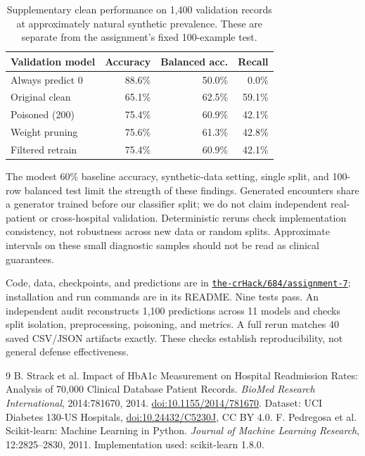 \documentclass[letterpaper,twocolumn,10pt]{article}
\begin{document}
\begin{table}[t]
\centering\small
\begin{tabular}{lrrr}
\toprule
Validation model & Accuracy & Balanced acc. & Recall\\
\midrule
Always predict 0 & 88.6\% & 50.0\% & 0.0\%\\
Original clean & 65.1\% & 62.5\% & 59.1\%\\
Poisoned (200) & 75.4\% & 60.9\% & 42.1\%\\
Weight pruning & 75.6\% & 61.3\% & 42.8\%\\
Filtered retrain & 75.4\% & 60.9\% & 42.1\%\\
\bottomrule
\end{tabular}
\caption{Supplementary clean performance on 1,400 validation records at approximately natural synthetic prevalence. These are separate from the assignment's fixed 100-example test.}
\label{tab:validation}
\end{table}

The modest 60\% baseline accuracy, synthetic-data setting, single split, and 100-row balanced test limit the strength of these findings. Generated encounters share a generator trained before our classifier split; we do not claim independent real-patient or cross-hospital validation. Deterministic reruns check implementation consistency, not robustness across new data or random splits. Approximate intervals on these small diagnostic samples should not be read as clinical guarantees.

Code, data, checkpoints, and predictions are in \href{https://github.com/the-crHack/684/tree/main/assignment-7}{\texttt{the-crHack/684/assignment-7}}; installation and run commands are in its README. Nine tests pass. An independent audit reconstructs 1,100 predictions across 11 models and checks split isolation, preprocessing, poisoning, and metrics. A full rerun matches 40 saved CSV/JSON artifacts exactly. These checks establish reproducibility, not general defense effectiveness.

\begin{thebibliography}{9}
B. Strack et al.
Impact of HbA1c Measurement on Hospital Readmission Rates: Analysis of 70,000 Clinical Database Patient Records.
\emph{BioMed Research International}, 2014:781670, 2014.
\href{https://doi.org/10.1155/2014/781670}{doi:10.1155/2014/781670}.
Dataset: UCI Diabetes 130-US Hospitals, \href{https://doi.org/10.24432/C5230J}{doi:10.24432/C5230J}, CC BY 4.0.
F. Pedregosa et al.
Scikit-learn: Machine Learning in Python.
\emph{Journal of Machine Learning Research}, 12:2825--2830, 2011.
Implementation used: scikit-learn 1.8.0.
\end{thebibliography}
\end{document}
